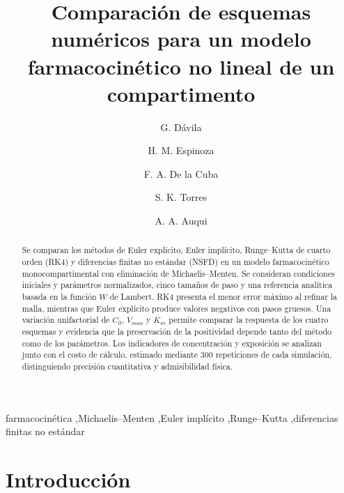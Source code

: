 \documentclass[11pt,final,5p,times,twocolumn,authoryear]{elsarticle}
\begin{document}
\begin{frontmatter}


\title{Comparación de esquemas numéricos para un modelo farmacocinético no lineal de un compartimento}


\author[utec]{G. Dávila}
\author[utec]{H. M. Espinoza}
\author[utec]{F. A. De la Cuba}
\author[utec]{S. K. Torres}
\author[utec]{A. A. Auqui}


\begin{abstract}
Se comparan los métodos de Euler explícito, Euler implícito, Runge--Kutta de cuarto orden (RK4) y diferencias finitas no estándar (NSFD) en un modelo farmacocinético monocompartimental con eliminación de Michaelis--Menten. Se consideran condiciones iniciales y parámetros normalizados, cinco tamaños de paso y una referencia analítica basada en la función $W$ de Lambert. RK4 presenta el menor error máximo al refinar la malla, mientras que Euler explícito produce valores negativos con pasos gruesos. Una variación unifactorial de $C_0$, $V_{max}$ y $K_m$ permite comparar la respuesta de los cuatro esquemas y evidencia que la preservación de la positividad depende tanto del método como de los parámetros. Los indicadores de concentración y exposición se analizan junto con el costo de cálculo, estimado mediante 300 repeticiones de cada simulación, distinguiendo precisión cuantitativa y admisibilidad física.
\end{abstract}


\begin{keyword}
farmacocinética \sep Michaelis--Menten \sep Euler implícito \sep Runge--Kutta \sep diferencias finitas no estándar
\end{keyword}


\end{frontmatter}
\fontsize{11}{13.2}\selectfont


\section{Introducción}
\label{introduction}
\end{document}
